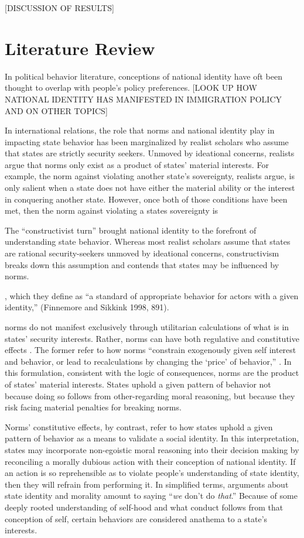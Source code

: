 \documentclass[12pt]{article}
\begin{document}
[DISCUSSION OF RESULTS]

\section{Literature Review}

In political behavior literature, conceptions of national identity have oft been thought to overlap with people's policy preferences. [LOOK UP HOW NATIONAL IDENTITY HAS MANIFESTED IN IMMIGRATION POLICY AND ON OTHER TOPICS]

In international relations, the role that norms and national identity play in impacting state behavior has been marginalized by realist scholars who assume that states are strictly security seekers. Unmoved by ideational concerns, realists argue that norms only exist as a product of states' material interests. For example, the norm against violating another state's sovereignty, realists argue, is only salient when a state does not have either the material ability or the interest in conquering another state. However, once both of those conditions have been met, then the norm against violating a states sovereignty is

The “constructivist turn” brought national identity to the forefront of understanding state behavior. Whereas most realist scholars assume that states are rational security-seekers unmoved by ideational concerns, constructivism breaks down this assumption and contends that states may be influenced by norms. 


, which they define as “a standard of appropriate behavior for actors with a given identity,” (Finnemore and Sikkink 1998, 891).  

norms do not manifest exclusively through utilitarian calculations of what is in states' security interests. Rather, norms can have both regulative and constitutive effects \citep{tannenwald_nuclear_2007, wendt_social_1999}. The former refer to how norms ``constrain exogenously given self interest and behavior, or lead to recalculations by changing the ‘price’ of behavior,'' \citep[~45]{tannenwald_nuclear_2007}. In this formulation, consistent with the logic of consequences, norms are the product of states' material interests. States uphold a given pattern of behavior not because doing so follows from other-regarding moral reasoning, but because they risk facing material penalties for breaking norms.

Norms' constitutive effects, by contrast, refer to how states uphold a given pattern of behavior as a means to validate a social identity. In this interpretation, states may incorporate non-egoistic moral reasoning into their decision making by reconciling a morally dubious action with their conception of national identity. If an action is so reprehensible as to violate people's understanding of state identity, then they will refrain from performing it. In simplified terms, arguments about state identity and morality amount to saying “\textit{we} don't do \textit{that}.” Because of some deeply rooted understanding of self-hood and what conduct follows from that conception of self, certain behaviors are considered anathema to a state's interests.
\end{document}
